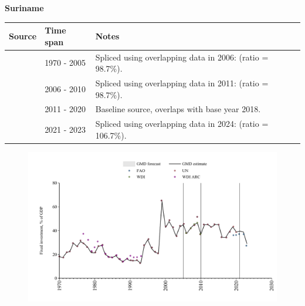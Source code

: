 \documentclass[12pt,a4paper,landscape]{article}
\begin{document}
\begin{adjustbox}{max totalsize={\paperwidth}{\paperheight},center}
\begin{minipage}[t][\textheight][t]{\textwidth}
\vspace*{0.5cm}
{}
\begin{center}
{\Large\bfseries Suriname}
\end{center}
\vspace{0.5cm}
\begin{table}[H]
\centering
\small
\begin{tabular}{|l|l|l|}
\hline
\textbf{Source} & \textbf{Time span} & \textbf{Notes} \\
\hline
\rowcolor{white}\cite{UN}& 1970 - 2005 &Spliced using overlapping data in 2006: (ratio = 98.7\%).\\
\rowcolor{lightgray}\cite{WDI}& 2006 - 2010 &Spliced using overlapping data in 2011: (ratio = 98.7\%).\\
\rowcolor{white}\cite{UN}& 2011 - 2020 &Baseline source, overlaps with base year 2018.\\
\rowcolor{lightgray}\cite{FAO}& 2021 - 2023 &Spliced using overlapping data in 2024: (ratio = 106.7\%).\\
\hline
\end{tabular}
\end{table}
\begin{figure}[H]
\centering
\includegraphics[width=\textwidth,height=0.6\textheight,keepaspectratio]{graphs/SUR_finv_GDP.pdf}
\end{figure}
\end{minipage}
\end{adjustbox}
\end{document}
